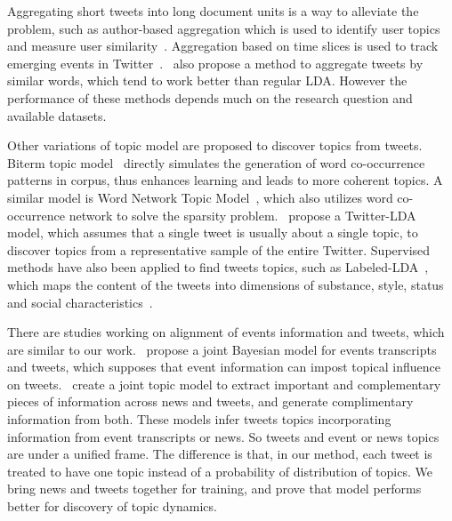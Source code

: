 Aggregating short tweets into long document units is a way to alleviate the problem, such as author-based aggregation which is used to identify user topics and measure user similarity~\cite{weng2010twitterrank}. Aggregation based on time slices is used to track emerging events in Twitter~\cite{lau2012line}.~ also propose a method to aggregate tweets by similar words, which tend to work better than regular LDA. However the performance of these methods depends much on the research question and available datasets.

Other variations of topic model are proposed to discover topics from tweets. Biterm topic model~\cite[BTM]{yan2013biterm} directly simulates the generation of word co-occurrence patterns in corpus, thus enhances learning and leads to more coherent topics. A similar model is Word Network Topic Model~\cite{zuo2014word}, which also utilizes word co-occurrence network to solve the sparsity problem.~ propose a Twitter-LDA model, which assumes that a single tweet is usually about a single topic, to discover topics from a representative sample of the entire Twitter. Supervised methods have also been applied to find tweets topics, such as Labeled-LDA~\cite{ramage2009labeled}, which maps the content of the tweets into dimensions of substance, style, status and social characteristics~\cite{ramage2010characterizing}.

There are studies working on alignment of events information and tweets, which are similar to our work.~ propose a joint Bayesian model for events transcripts and tweets, which supposes that event information can impost topical influence on tweets.~ create a joint topic model to extract important and complementary pieces of information across news and tweets, and generate complimentary information from both. These models infer tweets topics incorporating information from event transcripts or news. So tweets and event or news topics are under a unified frame. The difference is that, in our method, each tweet is treated to have one topic instead of a probability of distribution of topics. We bring news and tweets together for training, and prove that \stlda model performs better for discovery of topic dynamics.
